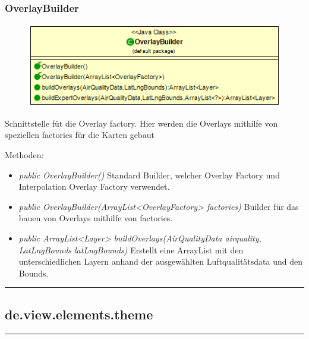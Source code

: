 \subsubsection{OverlayBuilder}
\begin{minipage}{0.5\textwidth}
    \begin{figure}[H]
        {\centering\includegraphics[scale = 0.5
        ]{media/view/factory/OverlayBuilder_Class.png}}
    \end{figure}
    \end{minipage} \hfill
    \begin{minipage}{0.4\textwidth}
Schnittstelle füt die Overlay factory. Hier werden die Overlays mithilfe von speziellen factories für die Karten gebaut
\end{minipage}
\vspace{\baselineskip}
Methoden: \begin{itemize} [noitemsep]
    \item \emph{public OverlayBuilder()} Standard Builder, welcher Overlay Factory und Interpolation Overlay Factory verwendet.
    \item \emph{public OverlayBuilder(ArrayList<OverlayFactory> factories)} Builder für das bauen von Overlays mithilfe von factories.
    \item \emph{public ArrayList<Layer> buildOverlays(AirQualityData airquality, LatLngBounds latLngBounds)} Erstellt eine ArrayList mit den unterschiedlichen Layern anhand der ausgewählten Luftqualitätsdata und den Bounds.
\end{itemize}


\rule{\textwidth}{0.4pt}
\subsection{de.view.elements.theme}

\rule{\textwidth}{0.4pt}
